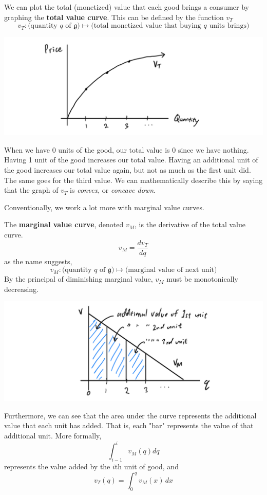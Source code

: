 \documentclass{article}
\begin{document}
    \begin{definition}
      We can plot the total (monetized) value that each good brings a consumer by graphing the \textbf{total value curve}. This can be defined by the function $v_T$
      \[v_T: \big( \text{quantity } q \text{ of } \mathfrak{g}\big) \mapsto \big(\text{total monetized value that buying } q \text{ units brings} \big)\]
      \begin{center}
          \includegraphics[scale=0.25]{img/Total_Value_Curve.PNG}
      \end{center}
      When we have 0 units of the good, our total value is 0 since we have nothing. Having 1 unit of the good increases our total value. Having an additional unit of the good increases our total value again, but not as much as the first unit did. The same goes for the third value. We can mathematically describe this by saying that the graph of $v_T$ is \textit{convex}, or \textit{concave down}. 
    \end{definition}

    Conventionally, we work a lot more with marginal value curves. 

    \begin{definition}
      The \textbf{marginal value curve}, denoted $v_M$, is the derivative of the total value curve. 
      \[v_M = \frac{d v_T}{d q}\]
      as the name suggests, 
      \[v_M: \big( \text{quantity } q \text{ of } \mathfrak{g}\big) \mapsto \big(\text{marginal value of next unit} \big)\]
      By the principal of diminishing marginal value, $v_M$ must be monotonically decreasing. 
      \begin{center}
          \includegraphics[scale=0.25]{img/Marginal_Value_Curve.PNG}
      \end{center}
      Furthermore, we can see that the area under the curve represents the additional value that each unit has added. That is, each "bar" represents the value of that additional unit. More formally, 
      \[\int_{i-1}^{i} v_M (q) dq\]
      represents the value added by the $i$th unit of good, and 
      \[v_T (q) = \int_0^q v_M (x) \,dx\]
    \end{definition}
\end{document}
